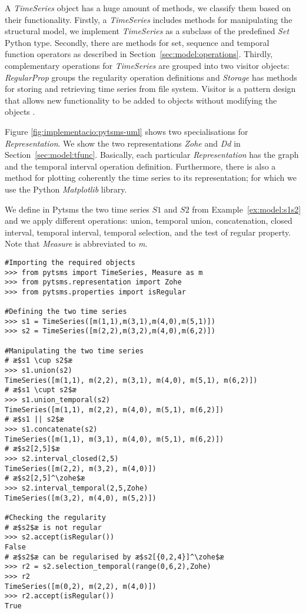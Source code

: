 A \emph{TimeSeries} object has a huge amount of methods, we classify
them based on their functionality. Firstly, a \emph{TimeSeries}
includes methods for manipulating the structural model, we implement
\emph{TimeSeries} as a subclass of the predefined \emph{Set} Python
type. Secondly, there are methods for set, sequence and temporal
function operators as described in Section~\ref{sec:model:operations}.
Thirdly, complementary operations for \emph{TimeSeries} are grouped
into two visitor objects: \emph{RegularProp} groups the regularity
operation definitions and \emph{Storage} has methods for storing and
retrieving time series from file system. Visitor is a pattern design
that allows new functionality to be added to objects without modifying
the objects
\cite{ziade08:expert_python_programming:visitor,martin02:visitor}.


Figure \ref{fig:implementacio:pytsms-uml} shows two specialisations
for \emph{Representation}. We show the two representations \emph{Zohe}
and \emph{Dd} in Section~\ref{sec:model:tfunc}. Basically, each
particular \emph{Representation} has the graph and the temporal
interval operation definition. Furthermore, there is also a method for
plotting coherently the time series to its representation; for which
we use the Python \emph{Matplotlib} library.



\begin{example}
  \label{ex:pytsms:example}
  We define in Pytsms the two time series $S1$ and $S2$ from
  Example~\ref{ex:model:s1s2} and we apply different operations:
  union, temporal union, concatenation, closed interval, \zohe{}
  temporal interval, \zohe{} temporal selection, and the test of
  regular property. Note that \emph{Measure} is abbreviated to
  \emph{m}.
\begin{lstlisting}[style=py]
#Importing the required objects
>>> from pytsms import TimeSeries, Measure as m
>>> from pytsms.representation import Zohe
>>> from pytsms.properties import isRegular

#Defining the two time series
>>> s1 = TimeSeries([m(1,1),m(3,1),m(4,0),m(5,1)])
>>> s2 = TimeSeries([m(2,2),m(3,2),m(4,0),m(6,2)])

#Manipulating the two time series
# æ$s1 \cup s2$æ
>>> s1.union(s2)
TimeSeries([m(1,1), m(2,2), m(3,1), m(4,0), m(5,1), m(6,2)])
# æ$s1 \cupt s2$æ
>>> s1.union_temporal(s2)
TimeSeries([m(1,1), m(2,2), m(4,0), m(5,1), m(6,2)])
# æ$s1 || s2$æ
>>> s1.concatenate(s2) 
TimeSeries([m(1,1), m(3,1), m(4,0), m(5,1), m(6,2)])
# æ$s2[2,5]$æ
>>> s2.interval_closed(2,5)
TimeSeries([m(2,2), m(3,2), m(4,0)])
# æ$s2[2,5]^\zohe$æ
>>> s2.interval_temporal(2,5,Zohe)
TimeSeries([m(3,2), m(4,0), m(5,2)])

#Checking the regularity
# æ$s2$æ is not regular
>>> s2.accept(isRegular())
False
# æ$s2$æ can be regularised by æ$s2[{0,2,4}]^\zohe$æ
>>> r2 = s2.selection_temporal(range(0,6,2),Zohe)
>>> r2
TimeSeries([m(0,2), m(2,2), m(4,0)])
>>> r2.accept(isRegular())
True
\end{lstlisting}
\end{example}





